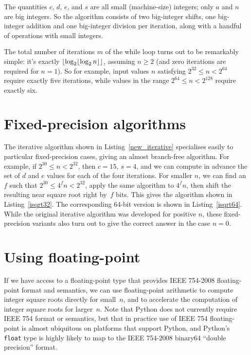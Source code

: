\documentclass[a4paper]{article}
\DeclarePairedDelimiter\floor{\lfloor}{\rfloor}
\theoremstyle{plain}
\theoremstyle{definition}
\begin{document}
The quantities $c$, $d$, $e$, and $s$ are all small (machine-size)
integers; only $a$ and $n$ are big integers. So the algorithm consists of
two big-integer shifts, one big-integer addition and one big-integer division per
iteration, along with a handful of operations with small integers.

The total number of iterations $m$ of the while loop turns out to be remarkably
simple: it's exactly $\floor*{\log_2 \floor{\log_2 n}}$, assuming $n\ge 2$ (and zero
iterations are required for $n = 1$). So
for example, input values $n$ satisfying $2^{32} \le n < 2^{64}$ require exactly
five iterations, while values in the range $2^{64} \le n < 2^{128}$ require
exactly six.

\section{Fixed-precision algorithms}

The iterative algorithm shown in Listing~\ref{new_iterative} specialises easily
to particular fixed-precision cases, giving an almost branch-free algorithm.
For example, if $2^{30} \le n < 2^{32}$, then $c = 15$, $s=4$, and we can
compute in advance the set of $d$ and $e$ values for each of the four
iterations. For smaller $n$, we can find an $f$ such that $2^{30} \le 4^f n <
2^{32}$, apply the same algorithm to $4^f n$, then shift the resulting near
square root right by~$f$ bits. This gives the algorithm shown in
Listing~\ref{isqrt32}. The corresponding 64-bit version is shown in
Listing~\ref{isqrt64}. While the original iterative algorithm was developed
for positive $n$, these fixed-precision variants also turn out
to give the correct answer in the case $n = 0$.






\section{Using floating-point}

If we have access to a floating-point type that provides IEEE 754-2008
floating-point format and semantics, we can use floating-point arithmetic to
compute integer square roots directly for small~$n$, and to accelerate the
computation of integer square roots for larger~$n$. Note that Python does not
currently require IEEE 754 format or semantics, but that in practice use of
IEEE 754 floating-point is almost ubiquitous on platforms that support Python,
and Python's \lstinline{float} type is highly likely to map to the IEEE
754-2008 binary64 ``double precision'' format.
\end{document}

